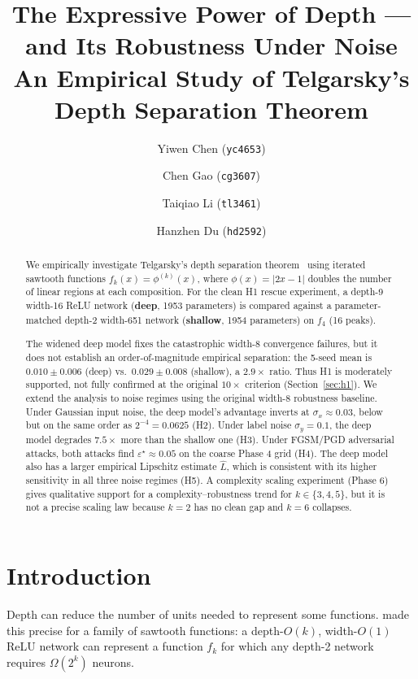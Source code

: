 \documentclass[10pt,twocolumn]{article}
\title{\textbf{The Expressive Power of Depth — and Its Robustness Under Noise}\\[4pt]
  \large An Empirical Study of Telgarsky's Depth Separation Theorem}
\author{Yiwen Chen (\texttt{yc4653}) \and Chen Gao (\texttt{cg3607}) \and Taiqiao Li (\texttt{tl3461}) \and Hanzhen Du (\texttt{hd2592})}
\date{}
\newcommand{\Lip}{\hat{L}}
\newcommand{\sigx}{\sigma_x}
\newcommand{\sigy}{\sigma_y}
\newcommand{\epst}{\varepsilon^\star}
\begin{document}
\maketitle

\begin{abstract}
We empirically investigate Telgarsky's depth separation theorem~\citep{telgarsky2016benefits}
using iterated sawtooth functions $f_k(x) = \phi^{(k)}(x)$, where $\phi(x)=|2x-1|$ doubles
the number of linear regions at each composition. For the clean H1 rescue experiment,
a depth-9 width-16 ReLU network (\textbf{deep}, 1953 parameters) is compared against a
parameter-matched depth-2 width-651 network (\textbf{shallow}, 1954 parameters) on
$f_4$ (16 peaks).

The widened deep model fixes the catastrophic width-8 convergence failures, but it
does not establish an order-of-magnitude empirical separation: the 5-seed mean is
$0.010\pm0.006$ (deep) vs.\ $0.029\pm0.008$ (shallow), a $2.9\times$ ratio.
Thus H1 is moderately supported, not fully confirmed at the original $10\times$
criterion (Section~\ref{sec:h1}).
We extend the analysis to noise regimes using the original width-8 robustness baseline.
Under Gaussian input noise, the deep model's advantage inverts at $\sigx \approx 0.03$,
below but on the same order as $2^{-4}=0.0625$ (H2).  Under label noise $\sigy = 0.1$,
the deep model degrades $7.5\times$ more than the shallow one (H3). Under FGSM/PGD
adversarial attacks, both attacks find $\epst \approx 0.05$ on the coarse Phase 4 grid
(H4). The deep model also has a larger empirical Lipschitz estimate $\Lip$, which is
consistent with its higher sensitivity in all three noise regimes (H5).
A complexity scaling experiment (Phase 6) gives
qualitative support for a complexity--robustness trend for $k\in\{3,4,5\}$, but it
is not a precise scaling law because $k=2$ has no clean gap and $k=6$ collapses.
\end{abstract}

\section{Introduction}
\label{sec:intro}

Depth can reduce the number of units needed to represent some functions.
\citet{telgarsky2016benefits} made this precise for a family of sawtooth functions:
a depth-$O(k)$, width-$O(1)$ ReLU network can represent a function $f_k$ for which
any depth-2 network requires $\Omega(2^k)$ neurons.
\end{document}
